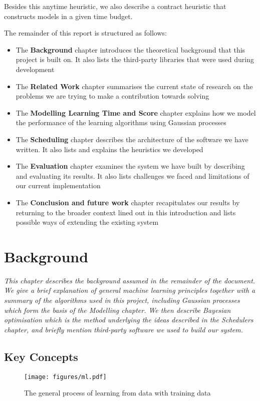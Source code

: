 \documentclass[a4paper,12pt,twoside,openright]{report}
\begin{document}
Besides this anytime heuristic, we also describe a contract heuristic that constructs models in a given time budget.


The remainder of this report is structured as follows:
\begin{itemize}
	\item The \textbf{Background} chapter introduces the theoretical background that this project is built on. It also lists the third-party libraries that were used during development
	\item The \textbf{Related Work} chapter summarises the current state of research on the problems we are trying to make a contribution towards solving
	\item The \textbf{Modelling Learning Time and Score} chapter explains how we model the performance of the learning algorithms using Gaussian processes
	\item The \textbf{Scheduling} chapter describes the architecture of the software we have written. It also lists and explains the heuristics we developed
	\item The \textbf{Evaluation} chapter examines the system we have built by describing and evaluating its results. It also lists challenges we faced and limitations of our current implementation
	\item The \textbf{Conclusion and future work} chapter recapitulates our results by returning to the broader context lined out in this introduction and lists possible ways of extending the existing system
\end{itemize}


\chapter{Background}
\textit{This chapter describes the background assumed in the remainder of the document. We give a brief explanation of general machine learning principles together with a summary of the algorithms used in this project, including Gaussian processes which form the basis of the Modelling chapter. We then describe Bayesian optimisation which is the method underlying the ideas described in the Schedulers chapter, and briefly mention third-party software we used to build our system.}


\section{Key Concepts}
\begin{figure}
\centering
  \texttt{[image: figures/ml.pdf]}
  \caption{The general process of learning from data with training data}
  \label{mlstructure}
\end{figure}
\end{document}
